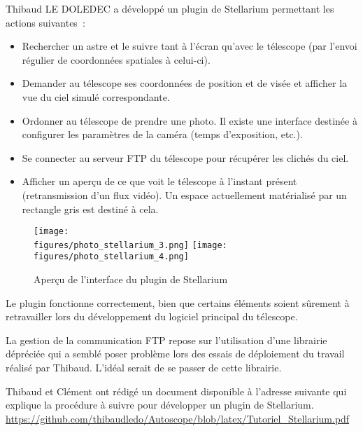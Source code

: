Thibaud LE DOLEDEC a développé un plugin de Stellarium permettant les actions suivantes~:
\begin{itemize}[label=$\bullet$]
	\item Rechercher un astre et le suivre tant à l'écran qu'avec le télescope (par l'envoi régulier de coordonnées spatiales à celui-ci).
	\item Demander au télescope ses coordonnées de position et de visée et afficher la vue du ciel simulé correspondante.
	\item Ordonner au télescope de prendre une photo. Il existe une interface destinée à configurer les paramètres de la caméra (temps d'exposition, etc.).
	\item Se connecter au serveur FTP du télescope pour récupérer les clichés du ciel.
	\item Afficher un aperçu de ce que voit le télescope à l'instant présent (retransmission d'un flux vidéo). Un espace actuellement matérialisé par un rectangle gris est destiné à cela.
	\end{itemize}

\vspace{1cm}

\begin{figure}[H]
    \centering
    \texttt{[image: \\figures/photo\_stellarium\_3.png]}
    \texttt{[image: \\figures/photo\_stellarium\_4.png]}
    \decoRule
    \caption[
    Aperçu de l'interface du plugin de Stellarium]{
    Aperçu de l'interface du plugin de Stellarium}
    \label{fig:Aperçu de l'interface du plugin de Stellarium}
    \end{figure}

\vspace{1cm}

Le plugin fonctionne correctement, bien que certains éléments soient sûrement à retravailler lors du développement du logiciel principal du télescope.

La gestion de la communication FTP repose sur l'utilisation d'une librairie dépréciée  qui a semblé poser problème lors des essais de déploiement du travail réalisé par Thibaud. L'idéal serait de se passer de cette librairie.

\vspace{1cm}

Thibaud et Clément ont rédigé un document disponible à l'adresse suivante qui explique la procédure à suivre pour développer un plugin de Stellarium.
\url{https://github.com/thibaudledo/Autoscope/blob/latex/Tutoriel_Stellarium.pdf}
